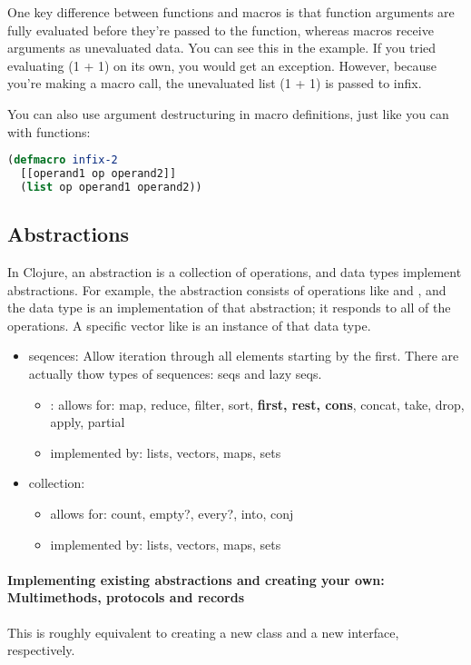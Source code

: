 One key difference between functions and macros is that function arguments are fully evaluated before they’re passed to the function, whereas macros receive arguments as unevaluated data. You can see this in the example. If you tried evaluating (1 + 1) on its own, you would get an exception. However, because you’re making a macro call, the unevaluated list (1 + 1) is passed to infix.

You can also use argument destructuring in macro definitions, just like you can with functions:
\begin{lstlisting}[language=lisp]
(defmacro infix-2
  [[operand1 op operand2]]
  (list op operand1 operand2))
\end{lstlisting}


\subsection{Abstractions}

In Clojure, an abstraction is a collection of operations, and data types implement abstractions. For example, the  abstraction consists of operations like  and , and the  data type is an implementation of that abstraction; it responds to all of the  operations. A specific vector like  is an instance of that data type.

\begin{itemize}
    \item seqences: Allow iteration through all elements starting by the first. There are actually thow types of sequences: seqs and lazy seqs. 
        \begin{itemize}
            \item: allows for: map, reduce, filter, sort, \textbf{first, rest, cons}, concat, take, drop, apply, partial
            \item implemented by: lists, vectors, maps, sets
        \end{itemize}
    \item collection: 
        \begin{itemize}
            \item allows for: count, empty?, every?, into, conj
            \item implemented by: lists, vectors, maps, sets
        \end{itemize}
\end{itemize}

\paragraph{Implementing existing abstractions and creating your own: Multimethods, protocols and records}
This is roughly equivalent to creating a new class and a new interface, respectively. 


